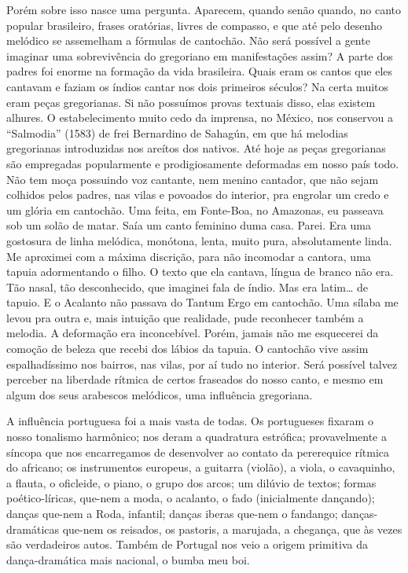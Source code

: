 Porém sobre isso nasce uma pergunta. Aparecem, quando senão quando, no
canto popular brasileiro, frases oratórias, livres de compasso, e que
até pelo desenho melódico se assemelham a fórmulas de cantochão. Não
será possível a gente imaginar uma sobrevivência do gregoriano em
manifestações assim? A parte dos padres foi enorme na formação da vida
brasileira. Quais eram os cantos que eles cantavam e faziam os índios
cantar nos dois primeiros séculos? Na certa muitos eram peças
gregorianas. Si não possuímos provas textuais disso, elas existem
alhures. O estabelecimento muito cedo da imprensa, no México, nos
conservou a ``Salmodia'' (1583) de frei Bernardino de Sahagún, em que há
melodias gregorianas introduzidas nos areítos dos nativos. Até hoje as
peças gregorianas são empregadas popularmente e prodigiosamente
deformadas em nosso país todo. Não tem moça possuindo voz cantante, nem
menino cantador, que não sejam colhidos pelos padres, nas vilas e
povoados do interior, pra engrolar um credo e um glória em cantochão.
Uma feita, em Fonte-Boa, no Amazonas, eu passeava sob um solão de matar.
Saía um canto feminino duma casa. Parei. Era uma gostosura de linha
melódica, monótona, lenta, muito pura, absolutamente linda. Me aproximei
com a máxima discrição, para não incomodar a cantora, uma tapuia
adormentando o filho. O texto que ela cantava, língua de branco não era.
Tão nasal, tão desconhecido, que imaginei fala de índio. Mas era
latim\ldots{} de tapuio. E o Acalanto não passava do Tantum Ergo em
cantochão. Uma sílaba me levou pra outra e, mais intuição que realidade,
pude reconhecer também a melodia. A deformação era inconcebível. Porém,
jamais não me esquecerei da comoção de beleza que recebi dos lábios da
tapuia. O cantochão vive assim espalhadíssimo nos bairros, nas vilas,
por aí tudo no interior. Será possível talvez perceber na liberdade
rítmica de certos fraseados do nosso canto, e mesmo em algum dos seus
arabescos melódicos, uma influência gregoriana.

A influência portuguesa foi a mais vasta de todas. Os portugueses
fixaram o nosso tonalismo harmônico; nos deram a quadratura estrófica;
provavelmente a síncopa que nos encarregamos de desenvolver ao contato
da pererequice rítmica do africano; os instrumentos europeus, a guitarra
(violão), a viola, o cavaquinho, a flauta, o oficleide, o piano, o grupo
dos arcos; um dilúvio de textos; formas poético-líricas, que-nem a moda,
o acalanto, o fado (inicialmente dançando); danças que-nem a Roda,
infantil; danças iberas que-nem o fandango; danças-dramáticas que-nem os
reisados, os pastoris, a marujada, a chegança, que às vezes são
verdadeiros autos. Também de Portugal nos veio a origem primitiva da
dança-dramática mais nacional, o bumba meu boi.

